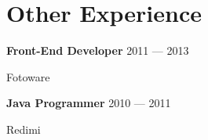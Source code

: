 \section{Other Experience}
\newcommand{\pos}[4]{%
	\parbox[t][][t]{\linewidth}{%
		\parbox{\linewidth}{\textbf{#1} \hfill {{#3} --- {#4}}}
		\parbox{\linewidth}{{#2}}
	}
\bigbreak
\smallskip
}


\pos{Front-End Developer}{Fotoware}{2011}{2013}
\pos{Java Programmer}{Redimi}{2010}{2011}


%
%
%


